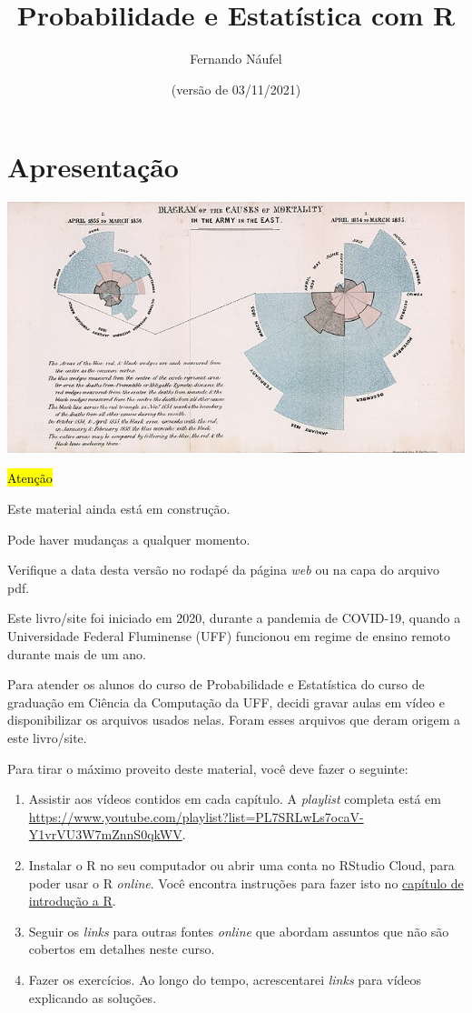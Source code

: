 \documentclass[
  12pt]{report}
\title{Probabilidade e Estatística com R}
\author{Fernando Náufel}
\date{(versão de 03/11/2021)}
\begin{document}
\maketitle

{
\setcounter{tocdepth}{1}
\tableofcontents
}
\hypertarget{apresentacao}{%
\chapter*{Apresentação}\label{apresentacao}}

\includegraphics{images/640px-Nightingale-mortality.jpg}

{\hl{Atenção}}

Este material ainda está em construção.

Pode haver mudanças a qualquer momento.

Verifique a data desta versão no rodapé da página \emph{web} ou na capa do arquivo pdf.

Este livro/site foi iniciado em 2020, durante a pandemia de COVID-19, quando a Universidade Federal Fluminense (UFF) funcionou em regime de ensino remoto durante mais de um ano.

Para atender os alunos do curso de Probabilidade e Estatística do curso de graduação em Ciência da Computação da UFF, decidi gravar aulas em vídeo e disponibilizar os arquivos usados nelas. Foram esses arquivos que deram origem a este livro/site.

Para tirar o máximo proveito deste material, você deve fazer o seguinte:

\begin{enumerate}
\def\labelenumi{\arabic{enumi}.}
\item
  Assistir aos vídeos contidos em cada capítulo. A \emph{playlist} completa está em \url{https://www.youtube.com/playlist?list=PL7SRLwLs7ocaV-Y1vrVU3W7mZnnS0qkWV}.
\item
  Instalar o R no seu computador ou abrir uma conta no RStudio Cloud, para poder usar o R \emph{online}. Você encontra instruções para fazer isto no \protect\hyperlink{rintro}{capítulo de introdução a R}.
\item
  Seguir os \emph{links} para outras fontes \emph{online} que abordam assuntos que não são cobertos em detalhes neste curso.
\item
  Fazer os exercícios. Ao longo do tempo, acrescentarei \emph{links} para vídeos explicando as soluções.
\end{enumerate}
\end{document}
